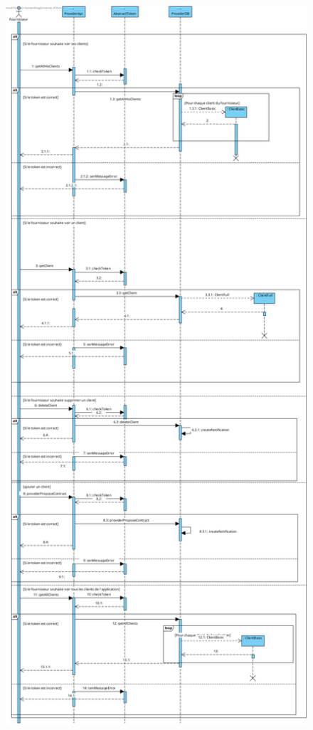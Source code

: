\newpage
\begin{figure}[h]
    \centering
    \includegraphics[height = 0.7\textheight]{Base/sequence/img/fournisseur/voir-ses-clients.png}
\end{figure}
\newpage
